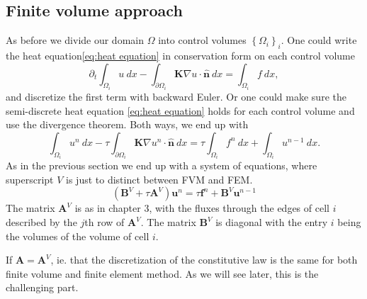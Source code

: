 \documentclass[../Main/main.tex]{subfiles}
\begin{document}
	\subsection*{Finite volume approach}
	As before we divide our domain $\Omega$ into control volumes $\left \{ \Omega_i \right \}_i$. One could write the heat equation\eqref{eq:heat equation} in conservation form on each control volume
	\begin{equation}\label{eq:semidiscrete FVM}
		\partial_t\int_{\Omega_i}u \ dx -\int_{\partial \Omega_i} \pmb{K}\nabla u \cdot \hat{\pmb{n}}\ dx = \int_{\Omega_i} f \ dx,
	\end{equation}
	and discretize the first term with backward Euler. Or one could make sure the semi-discrete heat equation \eqref{eq:heat equation} holds for each control volume and use the divergence theorem. Both ways, we end up with
	\begin{equation}
		\int_{\Omega_i} u^n \ dx - \tau\int_{\partial \Omega_i} \pmb{K}\nabla u^n \cdot \hat{\pmb{n}}\ dx = \tau \int_{\Omega_i} f^n \ dx + \int_{\Omega_i} u^{n-1} \ dx.
	\end{equation}
	As in the previous section we end up with a system of equations, where superscript $V$ is just to distinct between FVM and FEM.
	\begin{equation}\label{eq:heat fvm disc}
		(\pmb{B}^V + \tau \pmb{A}^V)\pmb{u}^n = \tau \pmb{f}^n + \pmb{B}^V\pmb{u}^{n-1}
	\end{equation}
	The matrix $\pmb{A}^V$ is as in chapter 3, with the fluxes through the edges of cell $i$ described by the $j$th row of $\pmb{A}^V$. The matrix $\pmb{B}^V$ is diagonal with the entry $i$ being the volumes of the volume of cell $i$.
	
	If $\pmb{A}= \pmb{A}^V$, ie. that the discretization of the constitutive law is the same for both finite volume and finite element method. As we will see later, this is the challenging part.	
\end{document}
